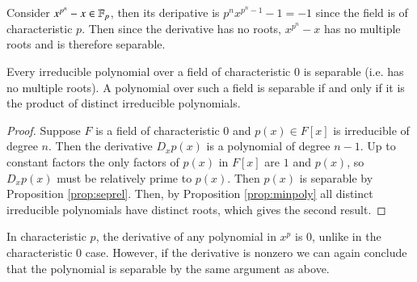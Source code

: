 \documentclass[12pt, a4paper, oneside, openright, titlepage]{book}
\begin{document}
\begin{eg}
    Consider $x^{p^n}-x \in \mathbb F_p$, then its deripative is $p^nx^{p^n-1}-1 = -1$ since the field is of characteristic $p$. Then since the derivative has no roots, $x^{p^n}-x$ has no multiple roots and is therefore separable.
\end{eg}

\begin{cor}
    Every irreducible polynomial over a field of characteristic $0$ is separable (i.e. has no multiple roots). A polynomial over such a field is separable if and only if it is the product of distinct irreducible polynomials.
\end{cor}
\begin{proof}
    Suppose $F$ is a field of characteristic $0$ and $p(x) \in F[x]$ is irreducible of degree $n$. Then the derivative $D_xp(x)$ is a polynomial of degree $n-1$. Up to constant factors the only factors of $p(x)$ in $F[x]$ are $1$ and $p(x)$, so $D_xp(x)$ must be relatively prime to $p(x)$. Then $p(x)$ is separable by Proposition \ref{prop:seprel}. Then, by Proposition \ref{prop:minpoly} all distinct irreducible polynomials have distinct roots, which gives the second result.
\end{proof}

In characteristic $p$, the derivative of any polynomial in $x^p$ is $0$, unlike in the characteristic $0$ case. However, if the derivative is nonzero we can again conclude that the polynomial is separable by the same argument as above.
\end{document}
